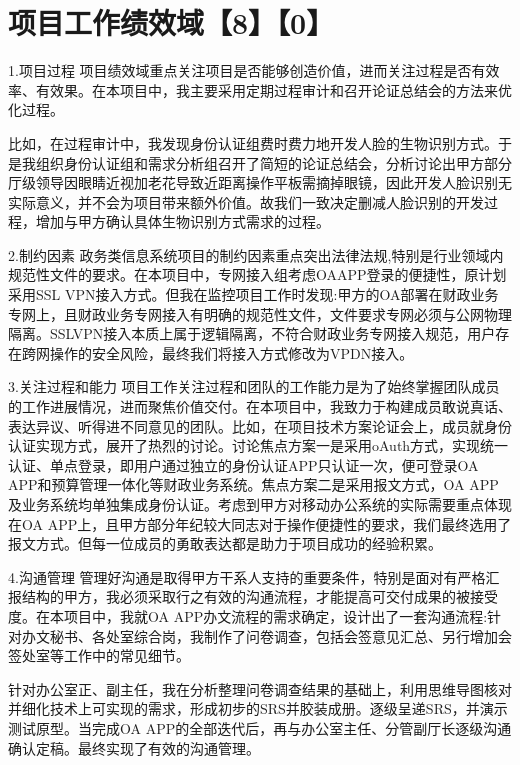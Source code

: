 \documentclass[UTF8]{../computerUniverse}
\begin{document}
\chapter{项目工作绩效域【8】【0】}


1.项目过程
项目绩效域重点关注项目是否能够创造价值，进而关注过程是否有效率、有效果。在本项目中，我主要采用定期过程审计和召开论证总结会的方法来优化过程。

比如，在过程审计中，我发现身份认证组费时费力地开发人脸的生物识别方式。于是我组织身份认证组和需求分析组召开了简短的论证总结会，分析讨论出甲方部分厅级领导因眼睛近视加老花导致近距离操作平板需摘掉眼镜，因此开发人脸识别无实际意义，并不会为项目带来额外价值。故我们一致决定删减人脸识别的开发过程，增加与甲方确认具体生物识别方式需求的过程。

2.制约因素
政务类信息系统项目的制约因素重点突出法律法规,特别是行业领域内规范性文件的要求。在本项目中，专网接入组考虑OAAPP登录的便捷性，原计划采用SSL VPN接入方式。但我在监控项目工作时发现:甲方的OA部署在财政业务专网上，且财政业务专网接入有明确的规范性文件，文件要求专网必须与公网物理隔离。SSLVPN接入本质上属于逻辑隔离，不符合财政业务专网接入规范，用户存在跨网操作的安全风险，最终我们将接入方式修改为VPDN接入。



3.关注过程和能力
项目工作关注过程和团队的工作能力是为了始终掌握团队成员的工作进展情况，进而聚焦价值交付。在本项目中，我致力于构建成员敢说真话、表达异议、听得进不同意见的团队。比如，在项目技术方案论证会上，成员就身份认证实现方式，展开了热烈的讨论。讨论焦点方案一是采用oAuth方式，实现统一认证、单点登录，即用户通过独立的身份认证APP只认证一次，便可登录OA APP和预算管理一体化等财政业务系统。焦点方案二是采用报文方式，OA APP及业务系统均单独集成身份认证。考虑到甲方对移动办公系统的实际需要重点体现在OA APP上，且甲方部分年纪较大同志对于操作便捷性的要求，我们最终选用了报文方式。但每一位成员的勇敢表达都是助力于项目成功的经验积累。


4.沟通管理
管理好沟通是取得甲方干系人支持的重要条件，特别是面对有严格汇报结构的甲方，我必须采取行之有效的沟通流程，才能提高可交付成果的被接受度。在本项目中，我就OA APP办文流程的需求确定，设计出了一套沟通流程:针对办文秘书、各处室综合岗，我制作了问卷调查，包括会签意见汇总、另行增加会签处室等工作中的常见细节。

针对办公室正、副主任，我在分析整理问卷调查结果的基础上，利用思维导图核对并细化技术上可实现的需求，形成初步的SRS并胶装成册。逐级呈递SRS，并演示测试原型。当完成OA APP的全部迭代后，再与办公室主任、分管副厅长逐级沟通确认定稿。最终实现了有效的沟通管理。
\end{document}
